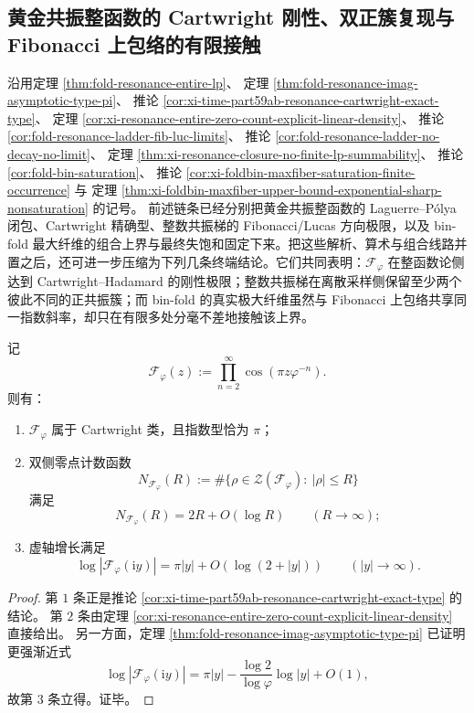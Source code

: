 \subsection{黄金共振整函数的 Cartwright 刚性、双正簇复现与 Fibonacci 上包络的有限接触}\label{subsec:conclusion-golden-resonance-cartwright-finite-contact}

沿用定理 \ref{thm:fold-resonance-entire-lp}、
定理 \ref{thm:fold-resonance-imag-asymptotic-type-pi}、
推论 \ref{cor:xi-time-part59ab-resonance-cartwright-exact-type}、
定理 \ref{cor:xi-resonance-entire-zero-count-explicit-linear-density}、
推论 \ref{cor:fold-resonance-ladder-fib-luc-limits}、
推论 \ref{cor:fold-resonance-ladder-no-decay-no-limit}、
定理 \ref{thm:xi-resonance-closure-no-finite-lp-summability}、
推论 \ref{cor:fold-bin-saturation}、
推论 \ref{cor:xi-foldbin-maxfiber-saturation-finite-occurrence} 与
定理 \ref{thm:xi-foldbin-maxfiber-upper-bound-exponential-sharp-nonsaturation} 的记号。
前述链条已经分别把黄金共振整函数的 Laguerre--P\'olya 闭包、Cartwright 精确型、整数共振梯的 Fibonacci/Lucas 方向极限，以及 bin-fold 最大纤维的组合上界与最终失饱和固定下来。把这些解析、算术与组合线路并置之后，还可进一步压缩为下列几条终端结论。它们共同表明：\(\mathcal F_\varphi\) 在整函数论侧达到 Cartwright--Hadamard 的刚性极限；整数共振梯在离散采样侧保留至少两个彼此不同的正共振簇；而 bin-fold 的真实极大纤维虽然与 Fibonacci 上包络共享同一指数斜率，却只在有限多处分毫不差地接触该上界。

\begin{theorem}\label{thm:conclusion-golden-resonance-cartwright-rigidity-zero-counting}
记
\[
\mathcal F_\varphi(z):=\prod_{n=2}^{\infty}\cos(\pi z\varphi^{-n}).
\]
则有：
\begin{enumerate}
  \item \(\mathcal F_\varphi\) 属于 Cartwright 类，且指数型恰为 \(\pi\)；
  \item 双侧零点计数函数
  \[
  N_{\mathcal F_\varphi}(R):=
  \#\{\rho\in\mathcal Z(\mathcal F_\varphi):\ |\rho|\le R\}
  \]
  满足
  \[
  N_{\mathcal F_\varphi}(R)=2R+O(\log R)
  \qquad (R\to\infty);
  \]
  \item 虚轴增长满足
  \[
  \log|\mathcal F_\varphi(\mathrm{i}y)|
  =
  \pi|y|+O(\log(2+|y|))
  \qquad (|y|\to\infty).
  \]
\end{enumerate}
\end{theorem}

\begin{proof}
第 \(1\) 条正是推论 \ref{cor:xi-time-part59ab-resonance-cartwright-exact-type} 的结论。
第 \(2\) 条由定理 \ref{cor:xi-resonance-entire-zero-count-explicit-linear-density} 直接给出。
另一方面，定理 \ref{thm:fold-resonance-imag-asymptotic-type-pi} 已证明更强渐近式
\[
\log|\mathcal F_\varphi(\mathrm{i}y)|
=
\pi|y|-\frac{\log 2}{\log\varphi}\log|y|+O(1),
\]
故第 \(3\) 条立得。证毕。
\end{proof}

